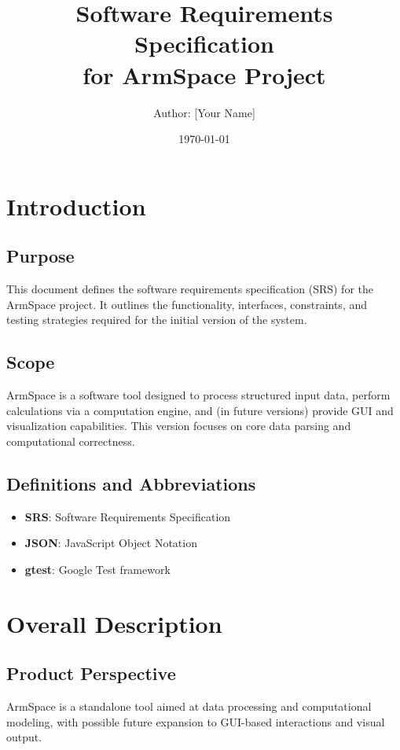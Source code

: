 \documentclass[a4paper,11pt]{article}
\title{\vspace{-2cm}Software Requirements Specification\\for ArmSpace Project}
\author{Author: [Your Name]}
\date{\today}
\begin{document}
	\maketitle
	
	\tableofcontents
	\newpage
	
	\section{Introduction}
	\subsection{Purpose}
	This document defines the software requirements specification (SRS) for the ArmSpace project. It outlines the functionality, interfaces, constraints, and testing strategies required for the initial version of the system.
	
	\subsection{Scope}
	ArmSpace is a software tool designed to process structured input data, perform calculations via a computation engine, and (in future versions) provide GUI and visualization capabilities. This version focuses on core data parsing and computational correctness.
	
	\subsection{Definitions and Abbreviations}
	\begin{itemize}
		\item \textbf{SRS}: Software Requirements Specification
		\item \textbf{JSON}: JavaScript Object Notation
		\item \textbf{gtest}: Google Test framework
	\end{itemize}
	
	\section{Overall Description}
	\subsection{Product Perspective}
	ArmSpace is a standalone tool aimed at data processing and computational modeling, with possible future expansion to GUI-based interactions and visual output.
	
\end{document}
